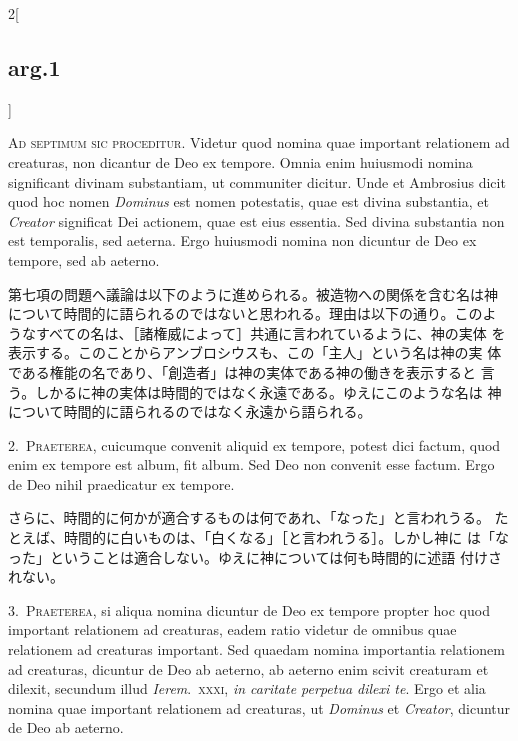 \documentclass[paper=a4paper,fontsize=10pt,jafontsize=9pt,titlepage]{jlreq}
\begin{document}
\begin{paracol}{2}[\subsection{arg.1}]

{\huge A}{\scshape d septimum sic proceditur}. Videtur quod nomina
quae important relationem ad creaturas, non dicantur de Deo ex
tempore. Omnia enim huiusmodi nomina significant divinam substantiam,
ut communiter dicitur. Unde et Ambrosius dicit quod hoc nomen
{\itshape Dominus} est nomen potestatis, quae est divina substantia,
et {\itshape Creator} significat Dei actionem, quae est eius
essentia. Sed divina substantia non est temporalis, sed aeterna. Ergo
huiusmodi nomina non dicuntur de Deo ex tempore, sed ab aeterno.

\switchcolumn

第七項の問題へ議論は以下のように進められる。被造物への関係を含む名は神
について時間的に語られるのではないと思われる。理由は以下の通り。このよ
うなすべての名は、［諸権威によって］共通に言われているように、神の実体
を表示する。このことからアンブロシウスも、この「主人」という名は神の実
体である権能の名であり、「創造者」は神の実体である神の働きを表示すると
言う。しかるに神の実体は時間的ではなく永遠である。ゆえにこのような名は
神について時間的に語られるのではなく永遠から語られる。


2.~{\scshape Praeterea}, cuicumque convenit aliquid ex tempore, potest
dici factum, quod enim ex tempore est album, fit album. Sed Deo non
convenit esse factum. Ergo de Deo nihil praedicatur ex tempore.

\switchcolumn

さらに、時間的に何かが適合するものは何であれ、「なった」と言われうる。
たとえば、時間的に白いものは、「白くなる」［と言われうる］。しかし神に
は「なった」ということは適合しない。ゆえに神については何も時間的に述語
付けされない。


3.~{\scshape Praeterea}, si aliqua nomina dicuntur de Deo ex tempore
propter hoc quod important relationem ad creaturas, eadem ratio
videtur de omnibus quae relationem ad creaturas important. Sed quaedam
nomina importantia relationem ad creaturas, dicuntur de Deo ab
aeterno, ab aeterno enim scivit creaturam et dilexit, secundum illud
{\itshape Ierem}.~{\scshape xxxi}, {\itshape in caritate perpetua
dilexi te}. Ergo et alia nomina quae important relationem ad
creaturas, ut {\itshape Dominus} et {\itshape Creator}, dicuntur de
Deo ab aeterno.


\end{paracol}
\end{document}
